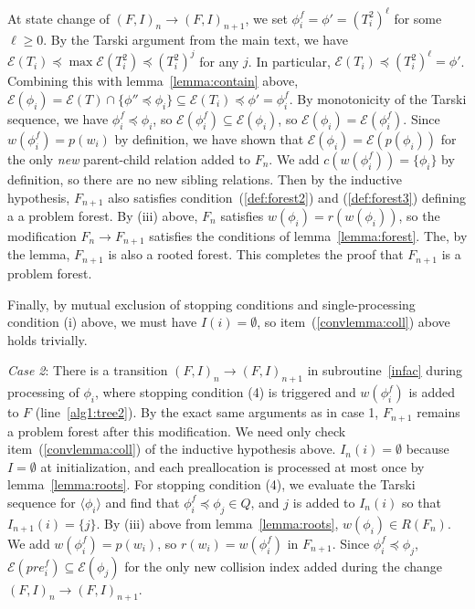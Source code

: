 \documentclass[11pt,reqno]{amsart}
\theoremstyle{definition}
\numberwithin{equation}{section}
\newcommand{\lag}{\langle}
\newcommand{\rag}{\rangle}
\newcommand{\pre}{\phi}
\newcommand{\sub}{\subseteq}
\newcommand{\fix}{\mathcal{E}}
\newcommand{\peq}{\preceq}
\newcommand{\act}{Q}
\newcommand{\coll}{I}
\newcommand{\forest}{F}
\newcommand{\pair}{(F,I)}
\newcommand{\roott}{R}
\begin{document}
\begin{enumerate}
At state change of $\pair_n \to \pair_{n + 1}$, we set $\pre_i^f = \pre' = (T_i^2)^{\ell}$ for some $\ell \geq 0$.
By the Tarski argument from the main text, we have $\fix(T_i) \peq \max \fix(T_i^2) \peq (T_i^2)^{j}$ for any $j$. 
In particular, $\fix(T_i) \peq (T_i^2)^{\ell} = \pre'$.
Combining this with lemma~\ref{lemma:contain} above, $\fix(\pre_i) = \fix(T) \cap \{\pre'' \peq \pre_i\} \sub \fix(T_i) \peq \pre' = \pre_i^f$. 
By monotonicity of the Tarski sequence, we have $\pre_i^f \peq \pre_i$, so $\fix(\pre_i^f) \sub \fix(\pre_i)$, so $\fix(\pre_i) = \fix(\pre_i^f)$.
Since $w(\pre_i^f) = p(w_i)$ by definition, we have shown that $\fix(\pre_i) = \fix(p(\pre_i))$ for the only \emph{new} parent-child relation added to $\forest_n$. 
We add $c(w(\pre_i^f)) = \{\pre_i\}$ by definition, so there are no new sibling relations. 
Then by the inductive hypothesis, $\forest_{n+1}$ also satisfies condition~(\ref{def:forest2}) and (\ref{def:forest3}) defining a a problem forest.
By (iii) above, $\forest_n$ satisfies $w(\pre_i) = r(w(\pre_i))$, so the modification $\forest_n \to \forest_{n + 1}$ satisfies the conditions of lemma~\ref{lemma:forest}.
The, by the lemma, $\forest_{n + 1}$ is also a rooted forest. 
This completes the proof that $\forest_{n + 1}$ is a problem forest.

Finally, by mutual exclusion of stopping conditions and single-processing condition (i) above, we must have $\coll(i) = \emptyset$, so item~(\ref{convlemma:coll}) above holds trivially.

\emph{Case 2}: There is a transition $\pair_n \to \pair_{n +1}$ in subroutine~\ref{infac} during processing of $\pre_i$, where stopping condition (4) is triggered and $w(\pre_i^f)$ is added to $\forest$ (line~\ref{alg1:tree2}). 
By the exact same arguments as in case 1, $F_{n + 1}$ remains a problem forest after this modification. 
We need only check item~(\ref{convlemma:coll}) of the inductive hypothesis above.
$\coll_n(i) = \emptyset$ because $I = \emptyset$ at initialization, and each preallocation is processed at most once by lemma~\ref{lemma:roots}.
For stopping condition (4), we evaluate the Tarski sequence for $\lag \pre_i \rag$ and find that $\pre_i^f \peq \pre_j \in \act$, and $j$ is added to $I_n(i)$ so that $I_{n + 1}(i) = \{j\}$. 
By (iii) above from lemma~\ref{lemma:roots}, $w(\pre_i) \in \roott(\forest_n)$. 
We add $w(\pre_i^f) = p(w_i)$, so $r(w_i) = w(\pre_i^f)$ in $\forest_{n+1}$. 
Since $\pre_i^f \peq \pre_j$, $\fix(pre_i^f) \sub \fix(\pre_j)$ for the only new collision index added during the change $\pair_n \to \pair_{n+1}$.


\end{enumerate}
\end{document}
